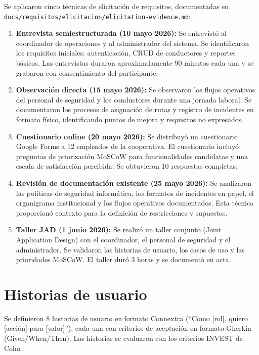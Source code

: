 Se aplicaron cinco técnicas de elicitación de requisitos, documentadas en \texttt{docs/requisitos/elicitacion/elicitation-evidence.md}:

\begin{enumerate}
  \item \textbf{Entrevista semiestructurada (10 mayo 2026):} Se entrevistó al coordinador de operaciones y al administrador del sistema. Se identificaron los requisitos iniciales: autenticación, CRUD de conductores y reportes básicos. Las entrevistas duraron aproximadamente 90 minutos cada una y se grabaron con consentimiento del participante.

  \item \textbf{Observación directa (15 mayo 2026):} Se observaron los flujos operativos del personal de seguridad y los conductores durante una jornada laboral. Se documentaron los procesos de asignación de rutas y registro de incidentes en formato físico, identificando puntos de mejora y requisitos no expresados.

  \item \textbf{Cuestionario online (20 mayo 2026):} Se distribuyó un cuestionario Google Forms a 12 empleados de la cooperativa. El cuestionario incluyó preguntas de priorización MoSCoW para funcionalidades candidatas y una escala de satisfacción percibida. Se obtuvieron 10 respuestas completas.

  \item \textbf{Revisión de documentación existente (25 mayo 2026):} Se analizaron las políticas de seguridad informática, los formatos de incidentes en papel, el organigrama institucional y los flujos operativos documentados. Esta técnica proporcionó contexto para la definición de restricciones y supuestos.

  \item \textbf{Taller JAD (1 junio 2026):} Se realizó un taller conjunto (Joint Application Design) con el coordinador, el personal de seguridad y el administrador. Se validaron las historias de usuario, los casos de uso y las prioridades MoSCoW. El taller duró 3 horas y se documentó en acta.
\end{enumerate}

\section{Historias de usuario}
\label{sec:hu}

Se definieron 8 historias de usuario en formato Connextra (``Como [rol], quiero [acción] para [valor]''), cada una con criterios de aceptación en formato Gherkin (Given/When/Then). Las historias se evaluaron con los criterios INVEST de Cohn \cite{cohn2004}.

